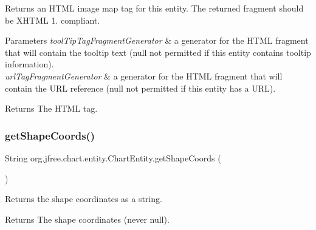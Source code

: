 Returns an H\+T\+ML image map tag for this entity. The returned fragment should be {\ttfamily X\+H\+T\+ML 1.} compliant.


\begin{DoxyParams}{Parameters}
{\em tool\+Tip\+Tag\+Fragment\+Generator} & a generator for the H\+T\+ML fragment that will contain the tooltip text ({\ttfamily null} not permitted if this entity contains tooltip information). \\
\hline
{\em url\+Tag\+Fragment\+Generator} & a generator for the H\+T\+ML fragment that will contain the U\+RL reference ({\ttfamily null} not permitted if this entity has a U\+RL).\\
\hline
\end{DoxyParams}
\begin{DoxyReturn}{Returns}
The H\+T\+ML tag. 
\end{DoxyReturn}
\mbox{\label{classorg_1_1jfree_1_1chart_1_1entity_1_1_chart_entity_a33831fe492f10323bc27e5e2c1452254}} 
\subsubsection{\texorpdfstring{get\+Shape\+Coords()}{getShapeCoords()}}
{\footnotesize\ttfamily String org.\+jfree.\+chart.\+entity.\+Chart\+Entity.\+get\+Shape\+Coords (\begin{DoxyParamCaption}{ }\end{DoxyParamCaption})}

Returns the shape coordinates as a string.

\begin{DoxyReturn}{Returns}
The shape coordinates (never {\ttfamily null}). 
\end{DoxyReturn}
\mbox{\label{classorg_1_1jfree_1_1chart_1_1entity_1_1_chart_entity_a5a16ddaa477380a0e60c60c546b211a6}} 
